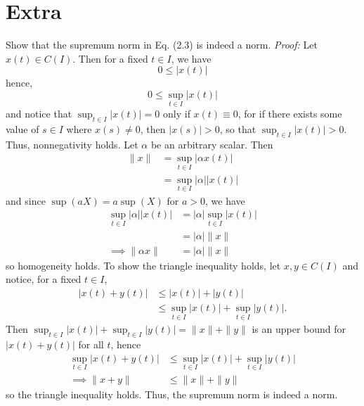 \documentclass{article}
\begin{document}
\section*{Extra}
Show that the supremum norm in Eq. (2.3) is indeed a norm.
\newline\newline
\textit{Proof:} Let $x(t) \in C(I)$. Then for a fixed $t \in I$, we have
\[0 \leq |x(t)|\]
hence,
\[0 \leq \sup_{t \in I} |x(t)|\]
and notice that $\sup_{t \in I} |x(t)| = 0$ only if $x(t) \equiv 0$, for if there exists some value of $s \in I$ where $x(s) \neq 0$, then $|x(s)| > 0$, so that $\sup_{t \in I} |x(t)| > 0$. Thus, nonnegativity holds. Let $\alpha$ be an arbitrary scalar. Then
\begin{align*}
    \|x\| &= \sup_{t \in I} |\alpha x(t)|\\
    &= \sup_{t \in I} |\alpha| |x(t)|
\end{align*}
and since $\sup(a X) = a\sup(X)$ for $a > 0$, we have
\begin{align*}
    \sup_{t \in I} |\alpha| |x(t)| &= |\alpha| \sup_{t \in I} |x(t)|\\
    &= |\alpha| \|x\|\\
    \implies \|\alpha x\| &= |\alpha| \|x\|
\end{align*}
so homogeneity holds. To show the triangle inequality holds, let $x, y \in C(I)$ and notice, for a fixed $t \in I$,
\begin{align*}
    |x(t) + y(t)| &\leq |x(t)| + |y(t)|\\
    &\leq \sup_{t \in I} |x(t)| + \sup_{t \in I} |y(t)|.
\end{align*}
Then $\sup_{t \in I} |x(t)| + \sup_{t \in I} |y(t)| = \|x\| + \|y\|$ is an upper bound for $|x(t) + y(t)|$ for all $t$, hence
\begin{align*}
    \sup_{t\in I}|x(t) + y(t)| &\leq \sup_{t \in I} |x(t)| + \sup_{t \in I} |y(t)|\\
    \implies \|x + y\| &\leq \|x\| + \|y\|
\end{align*}
so the triangle inequality holds. Thus, the supremum norm is indeed a norm.
\end{document}
